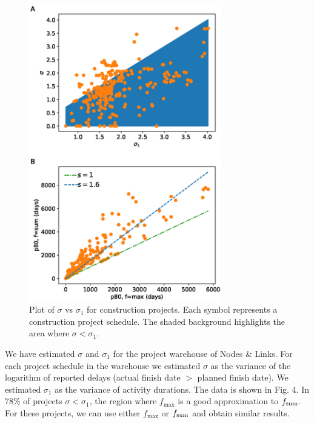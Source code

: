 \documentclass[reprint,aps,prl,amsmath,amssymb,superscriptaddress,showpacs]{revtex4-1}
\begin{document}
\begin{figure}[t]
\includegraphics[width=3.3in]{fig.sigma_vs_sigma1.eps}
\caption{Plot of $\sigma$ vs $\sigma_1$ for construction projects. Each symbol represents a construction project schedule. The shaded background highlights the area where $\sigma<\sigma_1$.}
\label{fig4}
\end{figure}

We have estimated $\sigma$ and $\sigma_1$ for the project warehouse of Nodes \& Links. For each project schedule in the warehouse we estimated $\sigma$ as the variance of the logarithm of reported delays (actual finish date $>$ planned finish date). We estimated $\sigma_1$ as the variance of activity durations. The data is shown in Fig. 4. In 78\% of projects $\sigma<\sigma_1$, the region where $f_{\max}$ is a good approximation to $f_{\rm sum}$. For these projects, we can use either $f_{\max}$ or $f_{\rm sum}$ and obtain similar results.
\end{document}
